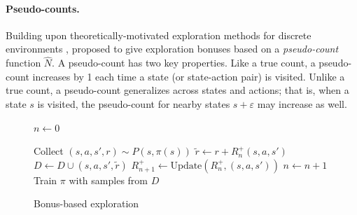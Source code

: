 \paragraph{Pseudo-counts.}
Building upon theoretically-motivated exploration methods for discrete environments \citep{strehl2008analysis}, \citet{bellemare2016unifying} proposed to give exploration bonuses based on a \emph{pseudo-count} function $\hat N$.
A pseudo-count has two key properties.
Like a true count, a pseudo-count increases by 1 each time a state (or state-action pair) is visited.
Unlike a true count, a pseudo-count generalizes across states and actions; that is, when a state $s$ is visited, the pseudo-count for nearby states $s + \varepsilon$ may increase as well.


\begin{figure}
\begin{algorithm}[H]
    \centering
    \caption{Bonus-based exploration}\label{alg:bbe}
    \begin{algorithmic}[1] %
        \item[]
        \State $n \gets 0$
        \Repeat
                \item[]
                \item[]
                \State Collect $(s, a, s', r) \sim P(s, \pi(s))$
                \State $\widetilde{r} \gets r + R^+_n(s, a, s')$
                \State $D \gets D \cup (s, a, s', \widetilde{r})$
                \State $R^+_{n+1} \gets \text{Update}(R^+_n, (s, a, s'))$
                \State $n \gets n + 1$
            \EndFor
            \State Train $\pi$ with samples from $D$
    \end{algorithmic}
\end{algorithm}
\hfill


\end{figure}
